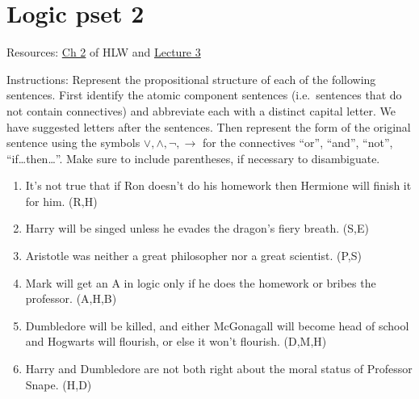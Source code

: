 \documentclass[fleqn,12pt]{article}
\begin{document}
\thispagestyle{empty}

\section*{Logic pset 2}

Resources: \href{https://www.jstor.org/stable/j.ctvxrpz0q.5}{Ch 2} of HLW and \href{https://princeton.hosted.panopto.com/Panopto/Pages/Viewer.aspx?id=ca5a58cd-b0e1-47a7-9fb1-acbd00ba6a46}{Lecture
  3}

Instructions: Represent the propositional structure of each of the
following sentences.  First identify the atomic component sentences
(i.e.\ sentences that do not contain connectives) and abbreviate each
with a distinct capital letter.  We have suggested letters after the
sentences.  Then represent the form of the original sentence using the
symbols $\vee ,\wedge ,\neg ,\to$ for the connectives ``or'', ``and'',
``not'', ``if\dots then\dots ''. Make sure to include parentheses, if
necessary to disambiguate.

\begin{enumerate}
\item It's not true that if Ron doesn't do his homework then Hermione
  will finish it for him.  (R,H)
\item Harry will be singed unless he evades the dragon's fiery breath.
  (S,E)
\item Aristotle was neither a great philosopher nor a great scientist.
  (P,S)
\item Mark will get an A in logic only if he does the homework or
bribes the professor. (A,H,B)
\item Dumbledore will be killed, and either McGonagall will become
  head of school and Hogwarts will flourish, or else it won't
  flourish. (D,M,H)
\item Harry and Dumbledore are not both right about the moral status
  of Professor Snape.  (H,D)
\end{enumerate}
\end{document}
